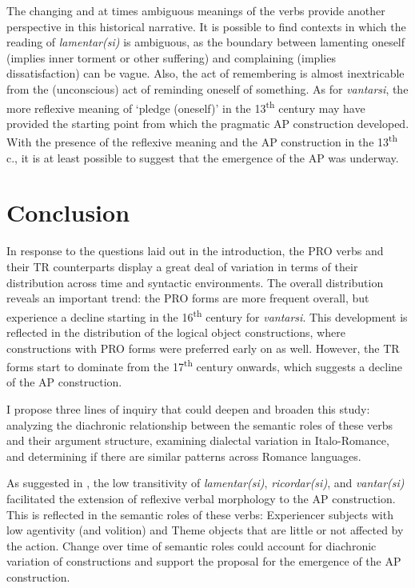 \documentclass[output=paper,colorlinks,citecolor=brown]{langscibook}
\begin{document}
The changing and at times ambiguous meanings of the verbs provide another perspective in this historical narrative. It is possible to find contexts in which the reading of \textit{lamentar(si)} is ambiguous, as the boundary between lamenting oneself (implies inner torment or other suffering) and complaining (implies dissatisfaction) can be vague. Also, the act of remembering is almost inextricable from the (unconscious) act of reminding oneself of something. As for \textit{vantarsi}, the more reflexive meaning of ‘pledge (oneself)’ in the 13\textsuperscript{th} century may have provided the starting point from which the pragmatic AP construction developed. With the presence of the reflexive meaning and the AP construction in the 13\textsuperscript{th} c., it is at least possible to suggest that the emergence of the AP was underway.

\section{Conclusion} \label{conclusion}

In response to the questions laid out in the introduction, the PRO verbs and their TR counterparts display a great deal of variation in terms of their distribution across time and syntactic environments. The overall distribution reveals an important trend: the PRO forms are more frequent overall, but experience a decline starting in the 16\textsuperscript{th} century for \textit{vantarsi}. This development is reflected in the distribution of the logical object constructions, where constructions with PRO forms were preferred early on as well. However, the TR forms start to dominate from the 17\textsuperscript{th} century onwards, which suggests a decline of the AP construction.

I propose three lines of inquiry that could deepen and broaden this study: analyzing the diachronic relationship between the semantic roles of these verbs and their argument structure, examining dialectal variation in Italo-Romance, and determining if there are similar patterns across Romance languages.

As suggested in , the low transitivity of \textit{lamentar(si)}, \textit{ricordar(si)}, and \textit{vantar(si)} facilitated the extension of reflexive verbal morphology to the AP construction. This is reflected in the semantic roles of these verbs: Experiencer subjects with low agentivity (and volition) and Theme objects that are little or not affected by the action. Change over time of semantic roles could account for diachronic variation of constructions and support the proposal for the emergence of the AP construction.
\end{document}
